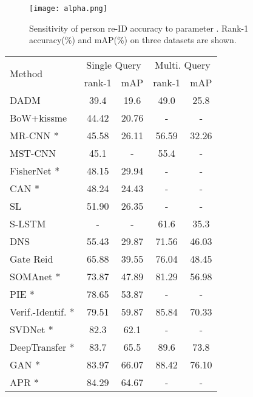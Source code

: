 \begin{figure}[t]
\begin{center}
\texttt{[image: alpha.png]}
\end{center}
   \caption{Sensitivity of person re-ID accuracy to parameter . Rank-1 accuracy(\%) and mAP(\%) on three datasets are shown.}
\label{fig:alpha}
\end{figure}

\setlength{\tabcolsep}{15pt}
\begin{table*}
\begin{center}
\begin{tabular}{l|cc|cc}
\hline
\multirow{2}{*}{Method} & \multicolumn{2}{c|}{Single Query} & \multicolumn{2}{c}{Multi. Query}\\
& rank-1 & mAP & rank-1  & mAP \\
\hline
DADM \cite{su2016deep} & 39.4 & 19.6 & 49.0 & 25.8  \\ 
BoW+kissme \cite{zheng2015scalable} & 44.42 & 20.76  & - & -\\
MR-CNN \cite{ustinova2015multiregion}* & 45.58 & 26.11 & 56.59 & 32.26 \\
MST-CNN \cite{liu2016multi} & 45.1 & - & 55.4 & -\\
FisherNet \cite{wu2016deep}* & 48.15 & 29.94 & - & -\\
CAN \cite{liu2016end}* & 48.24 & 24.43  & - & -\\
SL \cite{chen2016similarity} & 51.90 & 26.35  & - & -\\
S-LSTM \cite{varior2016siamese} & - & - & 61.6 & 35.3 \\
DNS \cite{zhang2016learning} & 55.43 & 29.87 & 71.56 & 46.03 \\
Gate Reid \cite{varior2016gated} & 65.88 & 39.55& 76.04 & 48.45 \\
SOMAnet \cite{barbosa2017looking}* & 73.87 & 47.89 & 81.29 & 56.98 \\
PIE \cite{zheng2017pose}* & 78.65 & 53.87 & - & -\\
Verif.-Identif. \cite{zheng2016discriminatively}* & 79.51 & 59.87  & 85.84 & 70.33 \\
SVDNet \cite{sun2017svdnet}* & 82.3 & 62.1 & - & -\\
DeepTransfer \cite{geng2016deep}* & 83.7 & 65.5 & 89.6 & 73.8 \\ 
GAN \cite{zheng2017unlabeled}* & 83.97 & 66.07 & 88.42 & 76.10  \\
APR \cite{lin2017improving}* & 84.29 & 64.67 & - & - \\

\end{tabular}
\end{center}
\end{table*}
